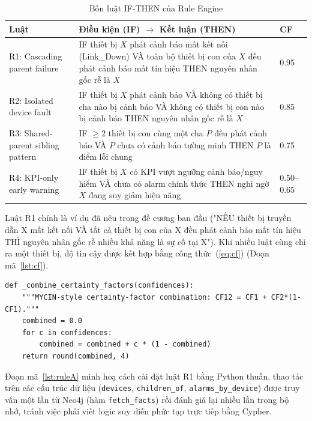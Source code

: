 \documentclass[12pt,a4paper]{report}
\newcommand{\code}[1]{\texttt{\small #1}}
\begin{document}
\begin{table}[H]
\centering
\caption{Bốn luật IF-THEN của Rule Engine}
\label{tab:rules}
\begin{tabular}{@{}p{2.6cm}p{7.6cm}p{1.6cm}@{}}
\toprule
\textbf{Luật} & \textbf{Điều kiện (IF) $\rightarrow$ Kết luận (THEN)} & \textbf{CF} \\
\midrule
R1: Cascading parent failure &
IF thiết bị $X$ phát cảnh báo mất kết nối (Link\_Down) VÀ toàn bộ thiết bị con của $X$ đều phát
cảnh báo mất tín hiệu THEN nguyên nhân gốc rễ là $X$ & 0.95 \\[4pt]
R2: Isolated device fault &
IF thiết bị $X$ phát cảnh báo VÀ không có thiết bị cha nào bị cảnh báo VÀ không có thiết bị con nào
bị cảnh báo THEN nguyên nhân gốc rễ là $X$ & 0.85 \\[4pt]
R3: Shared-parent sibling pattern &
IF $\geq 2$ thiết bị con cùng một cha $P$ đều phát cảnh báo VÀ $P$ chưa có cảnh báo tường minh THEN
$P$ là điểm lỗi chung & 0.75 \\[4pt]
R4: KPI-only early warning &
IF thiết bị $X$ có KPI vượt ngưỡng cảnh báo/nguy hiểm VÀ chưa có alarm chính thức THEN nghi ngờ $X$
đang suy giảm hiệu năng & 0.50--0.65 \\
\bottomrule
\end{tabular}
\end{table}

Luật R1 chính là ví dụ đã nêu trong đề cương ban đầu ("NẾU thiết bị truyền dẫn X mất kết nối VÀ
tất cả thiết bị con của X đều phát cảnh báo mất tín hiệu THÌ nguyên nhân gốc rễ nhiều khả năng là
sự cố tại X"). Khi nhiều luật cùng chỉ ra một thiết bị, độ tin cậy được kết hợp bằng công
thức~(\ref{eq:cf}) (Đoạn mã~\ref{lst:cf}).

\begin{lstlisting}[style=py,caption={Kết hợp độ tin cậy kiểu MYCIN (\texttt{src/rules/rule\_engine.py})},label=lst:cf]
def _combine_certainty_factors(confidences):
    """MYCIN-style certainty-factor combination: CF12 = CF1 + CF2*(1-CF1)."""
    combined = 0.0
    for c in confidences:
        combined = combined + c * (1 - combined)
    return round(combined, 4)
\end{lstlisting}

Đoạn mã~\ref{lst:ruleA} minh hoạ cách cài đặt luật R1 bằng Python thuần, thao tác trên các cấu trúc
dữ liệu (\code{devices}, \code{children\_of}, \code{alarms\_by\_device}) được truy vấn một lần từ
Neo4j (hàm \code{fetch\_facts}) rồi đánh giá lại nhiều lần trong bộ nhớ, tránh việc phải viết logic
suy diễn phức tạp trực tiếp bằng Cypher.
\end{document}
